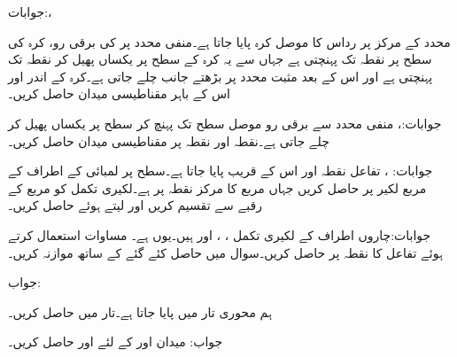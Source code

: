 جوابات:، 

محدد کے مرکز پر رداس  کا موصل کرہ پایا جاتا ہے۔منفی  محدد پر  کی برقی رو، کرہ کی سطح پر نقطہ  تک پہنچتی ہے جہاں سے یہ کرہ کے سطح پر یکساں پھیل کر نقطہ  تک پہنچتی ہے اور اس کے بعد مثبت  محدد پر بڑھتے جانب چلے جاتی ہے۔کرہ کے اندر اور اس کے باہر مقناطیسی میدان حاصل کریں۔

جوابات:،    
منفی  محدد سے برقی رو  موصل   سطح تک پہنچ کر سطح پر یکساں پھیل کر چلے جاتی ہے۔نقطہ  اور نقطہ  پر مقناطیسی میدان  حاصل کریں۔

جوابات: ، 
تفاعل  نقطہ  اور اس کے قریب پایا جاتا ہے۔سطح  پر  لمبائی کے اطراف کے مربع لکیر پر  حاصل کریں جہاں مربع کا مرکز نقطہ  پر ہے۔لکیری تکمل کو مربع کے رقبے سے تقسیم کریں اور  لیتے ہوئے  حاصل کریں۔

جوابات:چاروں اطراف کے لکیری تکمل ، ،   اور  ہیں۔یوں  ہے۔
مساوات  استعمال کرتے ہوئے تفاعل  کا نقطہ  پر  حاصل کریں۔سوال  میں حاصل کئے گئے  کے ساتھ موازنہ کریں۔

جواب: 

ہم محوری تار میں  پایا جاتا ہے۔تار میں  حاصل کریں۔

جواب:
میدان  اور  کے لئے  اور  حاصل کریں۔

